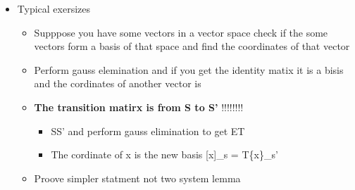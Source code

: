 \documentclass[twocolumn]{article}
\providecommand{\tightlist}{%
  \setlength{\itemsep}{0pt}\setlength{\parskip}{0pt}}
\begin{document}
\begin{itemize}
\tightlist
\item
  Typical exersizes

  \begin{itemize}
  \tightlist
  \item
    Supppose you have some vectors in a vector space check if the some
    vectors form a basis of that space and find the coordinates of that
    vector
  \item
    Perform gauss elemination and if you get the identity matix it is a
    bisis and the cordinates of another vector is
  \item
    \textbf{The transition matirx is from S to S'} !!!!!!!!

    \begin{itemize}
    \tightlist
    \item
      S\textbar{}S' and perform gauss elimination to get E\textbar{}T
    \item
      The cordinate of x is the new basis {[}x{]}\_s = T\{x\}\_s'
    \end{itemize}
  \item
    Proove simpler statment not two system lemma
  \end{itemize}
\end{itemize}
\end{document}
